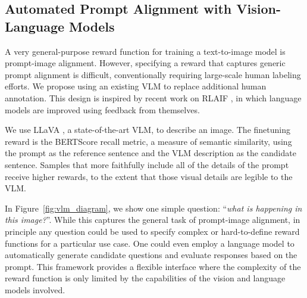 
\subsection{Automated Prompt Alignment with Vision-Language Models}

A very general-purpose reward function for training a text-to-image model is prompt-image alignment.
However, specifying a reward that captures generic prompt alignment is difficult, conventionally requiring large-scale human labeling efforts.
We propose using an existing VLM to replace additional human annotation.
This design is inspired by recent work on RLAIF \citep{bai2022constitutional}, in which language models are improved using feedback from themselves.

We use LLaVA \citep{liu2023llava}, a state-of-the-art VLM, to describe an image.
The finetuning reward is the BERTScore \citep{zhang2020bertscore} recall metric, a measure of semantic similarity, using the prompt as the reference sentence and the VLM description as the candidate sentence.
Samples that more faithfully include all of the details of the prompt receive higher rewards, to the extent that those visual details are legible to the VLM.

In Figure~\ref{fig:vlm_diagram}, we show one simple question: ``\emph{what is happening in this image?}''. While this captures the general task of prompt-image alignment, in principle any question could be used to specify complex or hard-to-define reward functions for a particular use case. One could even employ a language model to automatically generate candidate questions and evaluate responses based on the prompt. This framework provides a flexible interface where the complexity of the reward function is only limited by the capabilities of the vision and language models involved.